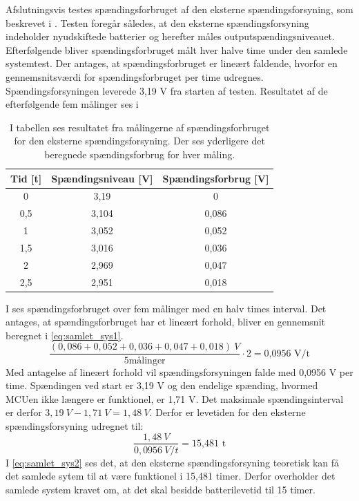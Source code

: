 Afslutningsvis testes spændingsforbruget af den eksterne spændingsforsyning, som beskrevet i . Testen foregår således, at den eksterne spændingsforsyning indeholder nyudskiftede batterier og herefter måles outputspændingsniveauet. Efterfølgende bliver spændingsforbruget målt hver halve time under den samlede systemtest. Der antages, at spændingsforbruget er lineært faldende, hvorfor en gennemsnitsværdi for spændingsforbruget per time udregnes. \\
Spændingsforsyningen leverede 3,19 V fra starten af testen. Resultatet af de efterfølgende fem målinger ses i 
\begin{table}[H]
	\centering
	\begin{tabular}{ccc}
		\hline
		\cellcolor[HTML]{C0C0C0}Tid {[}t{]} & \cellcolor[HTML]{C0C0C0} Spændingsniveau {[}V{]} & \cellcolor[HTML]{C0C0C0}Spændingsforbrug {[}V{]} \\ \hline
		0 & 3,19 & 0 \\ \hline	
		0,5 & 3,104 & 0,086 \\ \hline	
		1 & 3,052 & 0,052 \\ \hline
		1,5 & 3,016 & 0,036 \\ \hline
		2 & 2,969 & 0,047 \\ \hline
		2,5 & 2,951 & 0,018 \\ \hline
	\end{tabular}
	\caption{I tabellen ses resultatet fra målingerne af spændingsforbruget for den eksterne spændingsforsyning. Der ses yderligere det beregnede spændingsforbrug for hver måling.}
	\label{tab:samlet_sys_batteri}
\end{table}\vspace{-.25cm}
I  ses spændingsforbruget over fem målinger med en halv times interval. Det antages, at spændingsforbruget har et lineært forhold, bliver en gennemsnit beregnet i \eqref{eq:samlet_sys1}.
\begin{equation}
\frac{(0,086 + 0,052 + 0,036 + 0,047 + 0,018)~V}{5 \text{målinger}} \cdot 2 = \text{0,0956~V/t}
\label{eq:samlet_sys1}
\end{equation}
Med antagelse af lineært forhold vil spændingsforsyningen falde med 0,0956 V per time. Spændingen ved start er 3,19 V og den endelige spænding, hvormed MCUen ikke længere er funktionel, er 1,71 V. Det maksimale spændingsinterval er derfor $3,19~V - 1,71~V = 1,48~V$. Derfor er levetiden for den eksterne spændingsforsyning udregnet til:
\begin{equation}
\frac{1,48~V}{0,0956~V/t} = \text{15,481~t}
\label{eq:samlet_sys2}
\end{equation}
I \eqref{eq:samlet_sys2} ses det, at den eksterne spændingsforsyning teoretisk kan få det samlede sytem til at være funktionel i 15,481 timer. Derfor overholder det samlede system kravet om, at det skal besidde batterilevetid til 15 timer. 